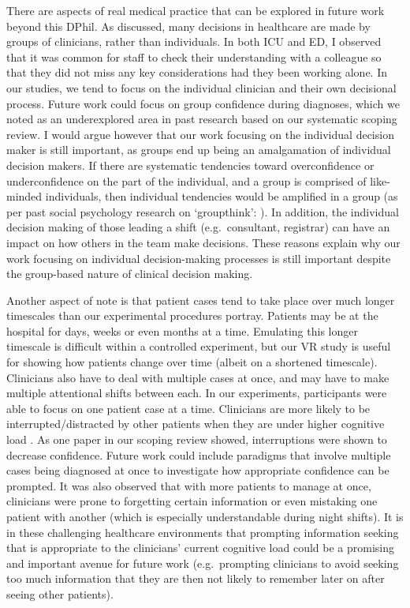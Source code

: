 \documentclass[a4paper, nobind]{templates/ociamthesis}
\begin{document}
\hfill\break
There are aspects of real medical practice that can be explored in future work beyond this DPhil. As discussed, many decisions in healthcare are made by groups of clinicians, rather than individuals. In both ICU and ED, I observed that it was common for staff to check their understanding with a colleague so that they did not miss any key considerations had they been working alone. In our studies, we tend to focus on the individual clinician and their own decisional process. Future work could focus on group confidence during diagnoses, which we noted as an underexplored area in past research based on our systematic scoping review. I would argue however that our work focusing on the individual decision maker is still important, as groups end up being an amalgamation of individual decision makers. If there are systematic tendencies toward overconfidence or underconfidence on the part of the individual, and a group is comprised of like-minded individuals, then individual tendencies would be amplified in a group (as per past social psychology research on `groupthink': \autocite{moorhead_empirical_1986,park_review_1990}). In addition, the individual decision making of those leading a shift (e.g.~consultant, registrar) can have an impact on how others in the team make decisions. These reasons explain why our work focusing on individual decision-making processes is still important despite the group-based nature of clinical decision making.

\hfill\break
Another aspect of note is that patient cases tend to take place over much longer timescales than our experimental procedures portray. Patients may be at the hospital for days, weeks or even months at a time. Emulating this longer timescale is difficult within a controlled experiment, but our VR study is useful for showing how patients change over time (albeit on a shortened timescale). Clinicians also have to deal with multiple cases at once, and may have to make multiple attentional shifts between each. In our experiments, participants were able to focus on one patient case at a time. Clinicians are more likely to be interrupted/distracted by other patients when they are under higher cognitive load \autocite{lavie_load_2004}. As one paper in our scoping review showed, interruptions were shown to decrease confidence. Future work could include paradigms that involve multiple cases being diagnosed at once to investigate how appropriate confidence can be prompted. It was also observed that with more patients to manage at once, clinicians were prone to forgetting certain information or even mistaking one patient with another (which is especially understandable during night shifts). It is in these challenging healthcare environments that prompting information seeking that is appropriate to the clinicians' current cognitive load could be a promising and important avenue for future work (e.g.~prompting clinicians to avoid seeking too much information that they are then not likely to remember later on after seeing other patients).
\end{document}
